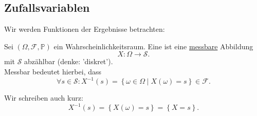 \subsection{Zufallsvariablen}
Wir werden Funktionen der Ergebnisse betrachten:
\begin{definition}\label{def:diskrete-zufallsvariable}
    Sei $(\Omega, \mathcal{F}, \mathbb{P})$ ein Wahrscheinlichkeitsraum. Eine  ist eine \underline{messbare} Abbildung
    \[
    X : \Omega \longrightarrow \mathcal{S}
    .\] 
    mit $\mathcal{S}$ abzählbar (denke: 'diskret'). \\
    Messbar bedeutet hierbei, dass
    \[
        \forall s\in \mathcal{S} \colon X^{-1}(s) = \left \{\omega\in \Omega\mid  X(\omega) = s\right\} \in  \mathcal{F}
    .\] 
\end{definition}
\begin{notation}
    Wir schreiben auch kurz:
    \[
        X^{-1}(s) = \left \{X(\omega) = s\right\}  = \left \{X = s\right\} 
    .\] 
\end{notation}

